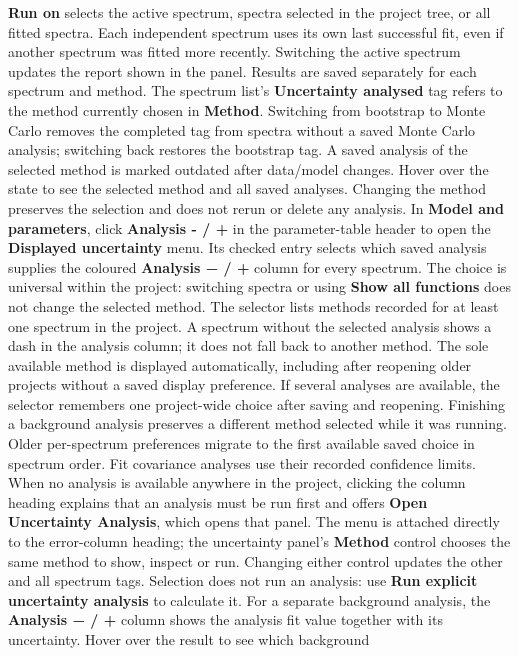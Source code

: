 \documentclass[
  10pt,
  a4paper,
  oneside]{scrreprt}
\begin{document}
\textbf{Run on} selects the active spectrum, spectra selected in the
project tree, or all fitted spectra. Each independent spectrum uses its
own last successful fit, even if another spectrum was fitted more
recently. Switching the active spectrum updates the report shown in the
panel. Results are saved separately for each spectrum and method. The
spectrum list's \textbf{Uncertainty analysed} tag refers to the method
currently chosen in \textbf{Method}. Switching from bootstrap to Monte
Carlo removes the completed tag from spectra without a saved Monte Carlo
analysis; switching back restores the bootstrap tag. A saved analysis of
the selected method is marked outdated after data/model changes. Hover
over the state to see the selected method and all saved analyses.
Changing the method preserves the selection and does not rerun or delete
any analysis. In \textbf{Model and parameters}, click \textbf{Analysis -
/ +} in the parameter-table header to open the \textbf{Displayed
uncertainty} menu. Its checked entry selects which saved analysis
supplies the coloured \textbf{Analysis − / +} column for every spectrum.
The choice is universal within the project: switching spectra or using
\textbf{Show all functions} does not change the selected method. The
selector lists methods recorded for at least one spectrum in the
project. A spectrum without the selected analysis shows a dash in the
analysis column; it does not fall back to another method. The sole
available method is displayed automatically, including after reopening
older projects without a saved display preference. If several analyses
are available, the selector remembers one project-wide choice after
saving and reopening. Finishing a background analysis preserves a
different method selected while it was running. Older per-spectrum
preferences migrate to the first available saved choice in spectrum
order. Fit covariance analyses use their recorded confidence limits.
When no analysis is available anywhere in the project, clicking the
column heading explains that an analysis must be run first and offers
\textbf{Open Uncertainty Analysis}, which opens that panel. The menu is
attached directly to the error-column heading; the uncertainty panel's
\textbf{Method} control chooses the same method to show, inspect or run.
Changing either control updates the other and all spectrum tags.
Selection does not run an analysis: use \textbf{Run explicit uncertainty
analysis} to calculate it. For a separate background analysis, the
\textbf{Analysis − / +} column shows the analysis fit value together
with its uncertainty. Hover over the result to see which background
\end{document}
